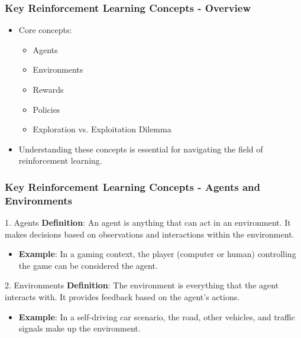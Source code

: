 \documentclass{beamer}
\begin{document}
\begin{frame}[fragile]
    \frametitle{Key Reinforcement Learning Concepts - Overview}
    \begin{itemize}
        \item Core concepts:
        \begin{itemize}
            \item Agents
            \item Environments
            \item Rewards
            \item Policies
            \item Exploration vs. Exploitation Dilemma
        \end{itemize}
        \item Understanding these concepts is essential for navigating the field of reinforcement learning.
    \end{itemize}
\end{frame}

\begin{frame}[fragile]
    \frametitle{Key Reinforcement Learning Concepts - Agents and Environments}
    \begin{block}{1. Agents}
        \textbf{Definition}: An agent is anything that can act in an environment. It makes decisions based on observations and interactions within the environment.
        \begin{itemize}
            \item \textbf{Example}: In a gaming context, the player (computer or human) controlling the game can be considered the agent.
        \end{itemize}
    \end{block}

    \begin{block}{2. Environments}
        \textbf{Definition}: The environment is everything that the agent interacts with. It provides feedback based on the agent’s actions.
        \begin{itemize}
            \item \textbf{Example}: In a self-driving car scenario, the road, other vehicles, and traffic signals make up the environment.
        \end{itemize}
    \end{block}
\end{frame}
\end{document}
